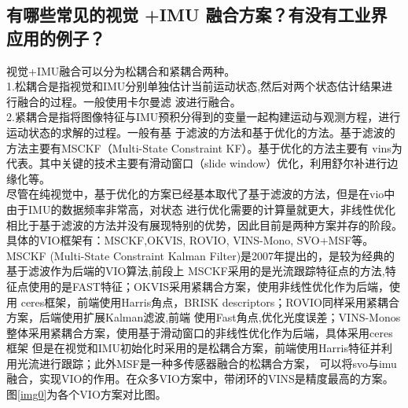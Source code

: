 \documentclass[UTF8]{ctexart}
\begin{document}
\subsection{有哪些常见的视觉 +IMU 融合方案？有没有工业界应用的例子？}
\indent 视觉+IMU融合可以分为松耦合和紧耦合两种。\\
\indent 1.松耦合是指视觉和IMU分别单独估计当前运动状态,然后对两个状态估计结果进行融合的过程。一般使用卡尔曼滤
波进行融合。\\
\indent 2.紧耦合是指将图像特征与IMU预积分得到的变量一起构建运动与观测方程，进行运动状态的求解的过程。一般有基
于滤波的方法和基于优化的方法。基于滤波的方法主要有MSCKF（Multi-State Constraint KF）。基于优化的方法主要有
vins为代表。其中关键的技术主要有滑动窗口（slide window）优化，利用舒尔补进行边缘化等。\\
\indent 尽管在纯视觉中，基于优化的方案已经基本取代了基于滤波的方法，但是在vio中由于IMU的数据频率非常高，对状态
进行优化需要的计算量就更大，非线性优化相比于基于滤波的方法并没有展现特别的优势，因此目前是两种方案并存的阶段。\\
\indent 具体的VIO框架有：MSCKF,OKVIS, ROVIO, VINS-Mono, SVO+MSF等。MSCKF 
(Multi-State Constraint Kalman Filter)是2007年提出的，是较为经典的基于滤波作为后端的VIO算法,前段上
MSCKF采用的是光流跟踪特征点的方法,特征点使用的是FAST特征；OKVIS采用紧耦合方案，使用非线性优化作为后端，使用
ceres框架，前端使用Harris角点，BRISK descriptors；ROVIO同样采用紧耦合方案，后端使用扩展Kalman滤波,前端
使用Fast角点,优化光度误差；VINS-Monos整体采用紧耦合方案，使用基于滑动窗口的非线性优化作为后端，具体采用ceres框架
但是在视觉和IMU初始化时采用的是松耦合方案，前端使用Harris特征并利用光流进行跟踪；此外MSF是一种多传感器融合的松耦合方案，
可以将svo与imu融合，实现VIO的作用。在众多VIO方案中，带闭环的VINS是精度最高的方案。图\ref {img0}为各个VIO方案对比图。\\
\end{document}
